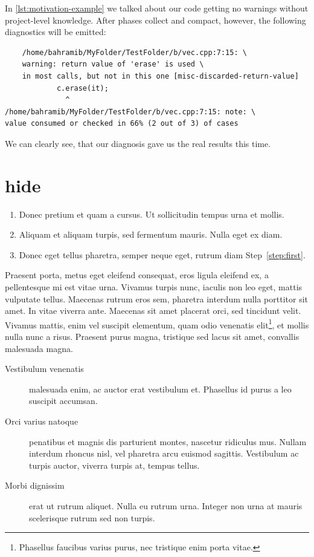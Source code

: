 In \cref{lst:motivation-example} we talked about our code getting no warnings without project-level knowledge.
After phases collect and compact, however, the following diagnostics will be emitted: %

\begin{lstlisting}
	/home/bahramib/MyFolder/TestFolder/b/vec.cpp:7:15: \
	warning: return value of 'erase' is used \
	in most calls, but not in this one [misc-discarded-return-value]
            c.erase(it);
              ^
/home/bahramib/MyFolder/TestFolder/b/vec.cpp:7:15: note: \
value consumed or checked in 66% (2 out of 3) of cases
\end{lstlisting}

We can clearly see, that our diagnosis gave us the real results this time.
















\iffalse
\chapter{hide}
		\begin{enumerate}
			\item\label{step:first} Donec pretium et quam a cursus. Ut sollicitudin tempus urna et mollis.
			\item Aliquam et aliquam turpis, sed fermentum mauris. Nulla eget ex diam.
			\item Donec eget tellus pharetra, semper neque eget, rutrum diam Step~\ref{step:first}.
		\end{enumerate}

		Praesent porta, metus eget eleifend consequat, eros ligula eleifend ex, a pellentesque mi est vitae urna. Vivamus turpis nunc, iaculis non leo eget, mattis vulputate tellus. Maecenas rutrum eros sem, pharetra interdum nulla porttitor sit amet. In vitae viverra ante. Maecenas sit amet placerat orci, 
		sed tincidunt velit. Vivamus mattis, enim vel suscipit elementum, quam odio venenatis elit\footnote{Phasellus faucibus varius purus, nec tristique enim porta vitae.}, et mollis nulla nunc a risus. Praesent purus magna, tristique sed lacus sit amet, convallis malesuada magna. 

		\begin{description}
			\item[Vestibulum venenatis] malesuada enim, ac auctor erat vestibulum et. Phasellus id purus a leo suscipit accumsan.
			\item[Orci varius natoque] penatibus et magnis dis parturient montes, nascetur ridiculus mus. Nullam interdum rhoncus nisl, vel pharetra arcu euismod sagittis. Vestibulum ac turpis auctor, viverra turpis at, tempus tellus.
			\item[Morbi dignissim] erat ut rutrum aliquet. Nulla eu rutrum urna. Integer non urna at mauris scelerisque rutrum sed non turpis.
		\end{description}

